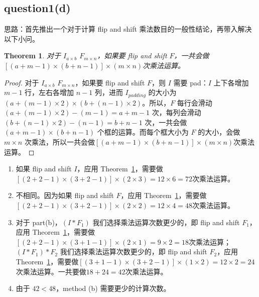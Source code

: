 \documentclass[a4paper,UTF8]{article}
\numberwithin{equation}{section}
\begin{document}
\subsection{question1(d)}
思路：首先推出一个对于计算 flip and shift 乘法数目的一般性结论，再带入解决以下小问。
\newtheorem{thm}{Theorem}
\begin{thm}
\label{T:major}
对于 $I_{a×b}$ $F_{m×n}$，如果要 flip and shift $F$，一共会做$[(a+m-1)×(b+n-1)]×(m×n)$次乘法运算。
\end{thm}
\begin{proof}
对于 $I_{a×b}$ $F_{m×n}$，如果要 flip and shift $F$，则 $I$ 需要 pad：$I$ 上下各增加 $m-1$ 行，左右各增加 $n-1$ 列，进而 $I_{padding}$ 的大小为 $(a+(m-1)×2)×(b+(n-1)×2)$。所以，$F$ 每行会滑动 $(a+(m-1)×2)-(m-1)=a+m-1$ 次，每列会滑动 $(b+(n-1)×2)-(n-1)=b+n-1$ 次，一共会做 $(a+m-1)×(b+n-1)$ 个框的运算。而每个框大小为 $F$ 的大小，会做 $m×n$ 次乘法，所以一共会做$[(a+m-1)×(b+n-1)]×(m×n)$次乘法运算。
\end{proof}
\begin{enumerate}[(\romannumeral1)]
	\item 如果 flip and shift $I$，应用 Theorem~\ref{T:major}，需要做$[(2+2-1)×(3+2-1)]×(2×3)=12×6=72$次乘法运算。
	\item 不相同。因为如果 flip and shift $F$，应用 Theorem~\ref{T:major}，需要做$[(2+2-1)×(3+2-1)]×(2×2)=12×4=48$次乘法运算。
	\item 对于 part(b)，$(I*F_1)$ 我们选择乘法运算次数更少的，即 flip and shift $F_1$，应用 Theorem~\ref{T:major}，需要做$[(2+2-1)×(3+1-1)]×(2×1)=9×2=18$次乘法运算；$(I*F_1)*F_2$ 我们选择乘法运算次数更少的，即 flip and shift $F_2$，应用 Theorem~\ref{T:major}，需要做$[(3+1-1)×(3+2-1)]×(1×2)=12×2=24$次乘法运算。一共要做$18+24=42$次乘法运算。
	\item 由于 $42<48$，method (b) 需要更少的计算次数。
\end{enumerate} 
\end{document}
